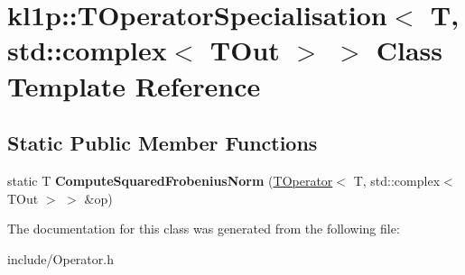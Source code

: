 \hypertarget{classkl1p_1_1TOperatorSpecialisation_3_01T_00_01std_1_1complex_3_01TOut_01_4_01_4}{}\section{kl1p\+:\+:T\+Operator\+Specialisation$<$ T, std\+:\+:complex$<$ T\+Out $>$ $>$ Class Template Reference}
\label{classkl1p_1_1TOperatorSpecialisation_3_01T_00_01std_1_1complex_3_01TOut_01_4_01_4}
\subsection*{Static Public Member Functions}
\begin{DoxyCompactItemize}
\item 
static T {\bfseries Compute\+Squared\+Frobenius\+Norm} (\hyperlink{classkl1p_1_1TOperator}{T\+Operator}$<$ T, std\+::complex$<$ T\+Out $>$ $>$ \&op)\hypertarget{classkl1p_1_1TOperatorSpecialisation_3_01T_00_01std_1_1complex_3_01TOut_01_4_01_4_a6512b70361aeebbd86b43c6af451dee4}{}\label{classkl1p_1_1TOperatorSpecialisation_3_01T_00_01std_1_1complex_3_01TOut_01_4_01_4_a6512b70361aeebbd86b43c6af451dee4}

\end{DoxyCompactItemize}


The documentation for this class was generated from the following file\+:\begin{DoxyCompactItemize}
\item 
include/Operator.\+h\end{DoxyCompactItemize}
